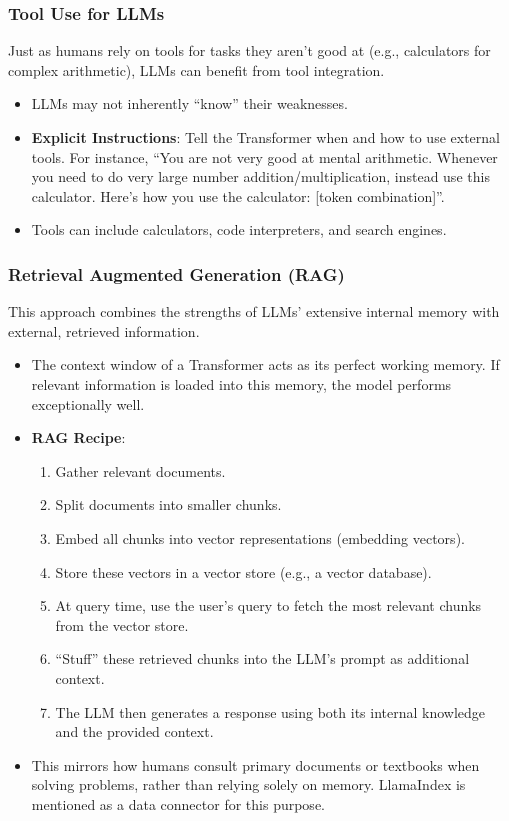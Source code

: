\subsubsection{Tool Use for LLMs}

Just as humans rely on tools for tasks they aren't good at (e.g., calculators for complex arithmetic), LLMs can benefit from tool integration.
\begin{itemize}
    \item LLMs may not inherently ``know'' their weaknesses.
    \item \textbf{Explicit Instructions}: Tell the Transformer when and how to use external tools. For instance, ``You are not very good at mental arithmetic. Whenever you need to do very large number addition/multiplication, instead use this calculator. Here's how you use the calculator: [token combination]''.
    \item Tools can include calculators, code interpreters, and search engines.
\end{itemize}

\subsubsection{Retrieval Augmented Generation (RAG)}

This approach combines the strengths of LLMs' extensive internal memory with external, retrieved information.
\begin{itemize}
    \item The context window of a Transformer acts as its perfect working memory. If relevant information is loaded into this memory, the model performs exceptionally well.
    \item \textbf{RAG Recipe}:
        \begin{enumerate}
            \item Gather relevant documents.
            \item Split documents into smaller chunks.
            \item Embed all chunks into vector representations (embedding vectors).
            \item Store these vectors in a vector store (e.g., a vector database).
            \item At query time, use the user's query to fetch the most relevant chunks from the vector store.
            \item ``Stuff'' these retrieved chunks into the LLM's prompt as additional context.
            \item The LLM then generates a response using both its internal knowledge and the provided context.
        \end{enumerate}
    \item This mirrors how humans consult primary documents or textbooks when solving problems, rather than relying solely on memory. LlamaIndex is mentioned as a data connector for this purpose.
\end{itemize}

